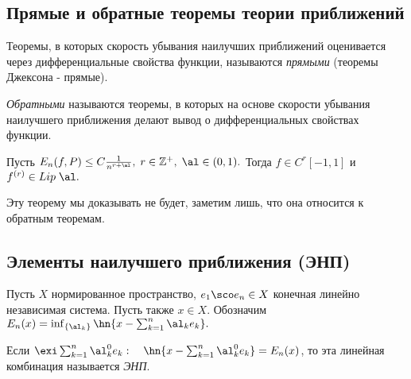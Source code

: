 \documentclass[a4paper]{article}
\begin{document}
\subsection{Прямые и обратные теоремы теории приближений}
\begin{df}
  Теоремы, в которых скорость убывания наилучших приближений оценивается через дифференциальные
  свойства функции, называются \emph{прямыми} (теоремы Джексона - прямые).
\end{df}

\begin{df}
  \emph{Обратными} называются теоремы, в
  которых на основе скорости убывания наилучшего приближения делают
  вывод о дифференциальных свойствах функции.
\end{df}

\begin{theorem}[Бернштейн] Пусть $E_n(f,P)\le C
\frac1{n^{r+\al}},\; r\in\mathbb{Z}^{+},\;\al\in(0,1).$
Тогда $f\in C^r[-1,1]$ и \\\hangindent=5cm$f^{(r)}\in
Lip\;\al.$
\end{theorem}
Эту теорему мы доказывать не будет, заметим лишь, что она
относится к обратным теоремам.

\subsection{Элементы наилучшего приближения (ЭНП)}

Пусть $X$ нормированное пространство, $e_1\sco e_n\in X$ конечная линейно независимая система. Пусть также $x\in X$.
Обозначим $E_n(x)=\inf_{\{\al_k\}}\hn{x-\sum_{k=1}^n \al_k e_k}.$

\begin{df}
  Если $\exi\sum_{k=1}^n \al_k^0
  e_k:\quad\hn{x-\sum_{k=1}^n \al_k^0 e_k}=E_n(x)$, то эта
  линейная комбинация называется \emph{ЭНП}.
\end{df}
\end{document}
